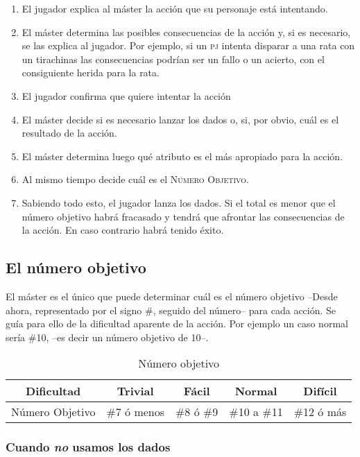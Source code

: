 \begin{enumerate}
\item El jugador explica al máster la acción que su personaje está intentando.
\item El máster determina las posibles consecuencias de la acción y, 
si es necesario, se las explica al jugador. Por ejemplo, si un \textsc{pj} intenta disparar a una rata con un tirachinas las consecuencias podrían ser un fallo o un acierto, con el consiguiente herida para la rata.
\item El jugador confirma que quiere intentar la acción
\item El máster decide si es necesario lanzar los dados o, si, por obvio, cuál es el resultado de la acción.
\item El máster determina luego qué atributo es el más apropiado para la acción.
\item Al mismo tiempo decide cuál es el \textsc{Número Objetivo}.
\item Sabiendo todo esto, el jugador lanza los dados. Si el total es menor que el número objetivo habrá fracasado y tendrá que afrontar las consecuencias de la acción. En caso contrario habrá tenido éxito.
\end{enumerate}

\subsection{El número objetivo}
El máster es el único que puede determinar cuál es el número objetivo --Desde ahora, representado por el signo \#, seguido del número--  para cada acción. Se guía para ello de la dificultad aparente de la acción. Por ejemplo un caso normal sería \#10, --es decir un número objetivo de 10--.

\begin{table}[h]
\centering
\begin{tabular}{ccccc}
\toprule
Dificultad&Trivial&Fácil&Normal&Difícil\\\midrule
Número Objetivo&\#7 ó menos&\#8 ó \#9&\#10 a \#11&\#12 ó más\\\midrule
\bottomrule
\end{tabular}
\caption{Número objetivo}
\end{table}

\subsubsection*{Cuando \emph{no} usamos los dados}

